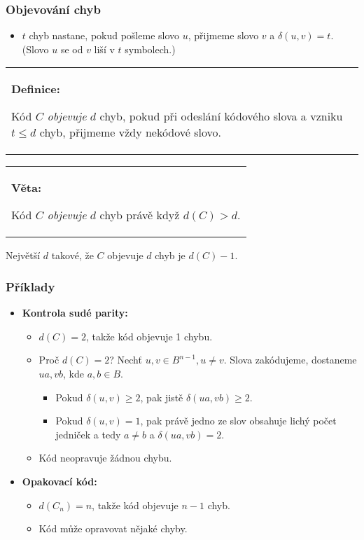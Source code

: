 \documentclass{beamer}
\newenvironment{definice}
{
    \begin{center}
    \begin{tabular}{p{9cm}}
    \textbf{Definice:}
}
{
    \end{tabular}
    \end{center}
}
\newenvironment{veta}
{
    \begin{center}
    \begin{tabular}{p{9cm}}
    \textbf{Věta:}
}
{
    \end{tabular}
    \end{center}
}
\newenvironment{itemizex}%
  {\large \begin{itemize}%
    \setlength{\itemsep}{8pt}%
    \setlength{\parskip}{8pt}}%
  {\end{itemize}}
\begin{document}
\begin{frame}[t,fragile]\frametitle{Objevování chyb} 
    \begin{itemizex}
        \item $t$ chyb nastane, pokud pošleme slovo $u$, přijmeme slovo $v$ a $\delta(u,v)=t$. (Slovo $u$ se od $v$ liší v $t$ symbolech.)
    \end{itemizex}

\begin{definice}
Kód $C$ \textit{objevuje} $d$ chyb, pokud při odeslání kódového slova a vzniku $t\le d$ chyb, přijmeme vždy nekódové slovo.
\end{definice}

\begin{veta}
Kód $C$ \textit{objevuje} $d$ chyb právě když $d(C)>d$.
\end{veta}

Největší $d$ takové, že $C$ objevuje $d$ chyb je $d(C)-1$.
\end{frame}


\begin{frame}[t,fragile]\frametitle{Příklady} 
    \begin{itemizex}
        \item \textbf{Kontrola sudé parity:}
        \begin{itemize}
            \item $d(C)=2$, takže kód objevuje 1 chybu.
            \item Proč $d(C)=2$? Nechť $u,v\in B^{n-1}, u\ne v$. Slova zakódujeme, dostaneme $ua, vb$, kde $a, b\in B$. 
            \begin{itemize}
                \item Pokud $\delta(u,v)\ge2$, pak jistě $\delta(ua, vb)\ge2$.
                \item Pokud $\delta(u,v)=1$, pak právě jedno ze slov obsahuje lichý počet jedniček a tedy $a\ne b$ a $\delta(ua, vb)=2$. 
            \end{itemize}
            \item Kód neopravuje žádnou chybu.
        \end{itemize}
        \item \textbf{Opakovací kód:}
            \begin{itemize}
                \item $d(C_n)=n$, takže kód objevuje $n-1$ chyb.
                \item Kód může opravovat nějaké chyby.
            \end{itemize}
    \end{itemizex}
\end{frame}
\end{document}
